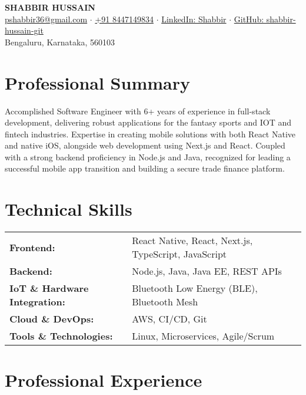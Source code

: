 \documentclass[11pt,a4paper]{article}
\begin{document}
\begin{center}
    {\LARGE\textbf{SHABBIR HUSSAIN}}\\[8pt]
    \href{mailto:pshabbir36@gmail.com}{pshabbir36@gmail.com} $\cdot$ 
    \href{tel:+1234567890}{+91 8447149834} $\cdot$ 
    \href{www.linkedin.com/in/hshabbir36}{LinkedIn: Shabbir} $\cdot$ 
    \href{https://github.com/shabbir-hussain-git}{GitHub: shabbir-hussain-git}\\[4pt]
    Bengaluru, Karnataka, 560103
\end{center}

\vspace{8pt}

\section{Professional Summary}
Accomplished Software Engineer with 6+ years of experience in full-stack development, delivering robust applications for the fantasy sports and IOT and fintech industries. Expertise in creating mobile solutions with both React Native and native iOS, alongside web development using Next.js and React. Coupled with a strong backend proficiency in Node.js and Java, recognized for leading a successful mobile app transition and building a secure trade finance platform.

\section{Technical Skills}
\begin{tabularx}{\textwidth}{@{}l X@{}}
\textbf{Frontend:} &  React Native, React, Next.js, TypeScript, JavaScript \\
\textbf{Backend:} & Node.js, Java, Java EE, REST APIs \\
\textbf{IoT \& Hardware Integration:} & Bluetooth Low Energy (BLE), Bluetooth Mesh \\
\textbf{Cloud \& DevOps:} & AWS, CI/CD, Git \\
\textbf{Tools \& Technologies:} & Linux, Microservices, Agile/Scrum \\
\end{tabularx}

\section{Professional Experience}
\end{document}
